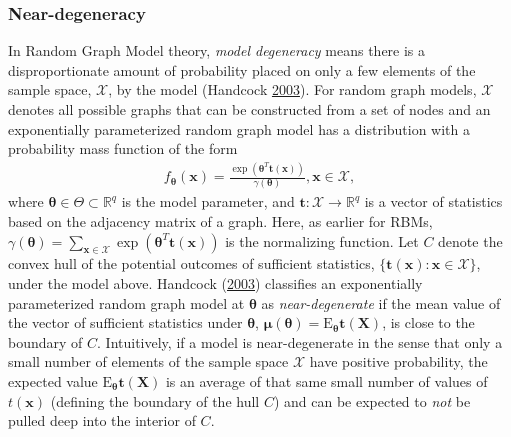 \documentclass[]{article}
\theoremstyle{definition}
\begin{document}
\hypertarget{near-degeneracy}{%
\subsubsection{Near-degeneracy}\label{near-degeneracy}}

In Random Graph Model theory, \emph{model degeneracy} means there is a
disproportionate amount of probability placed on only a few elements of
the sample space, \(\mathcal{X}\), by the model (Handcock
\protect\hyperlink{ref-handcock2003assessing}{2003}). For random graph
models, \(\mathcal{X}\) denotes all possible graphs that can be
constructed from a set of nodes and an exponentially parameterized
random graph model has a distribution with a probability mass function
of the form \begin{align*}
f_{\boldsymbol \theta} (\boldsymbol x) = \frac{\exp\left(\boldsymbol \theta^T \boldsymbol t(\boldsymbol x)\right)}{\gamma(\boldsymbol \theta)}, \boldsymbol x \in \mathcal{X},
\end{align*} where
\(\boldsymbol \theta \in \Theta \subset \mathbb{R}^q\) is the model
parameter, and \(\boldsymbol t: \mathcal{X} \rightarrow \mathbb{R}^q\)
is a vector of statistics based on the adjacency matrix of a graph.
Here, as earlier for RBMs,
\(\gamma(\boldsymbol \theta) = \sum_{\boldsymbol x \in \mathcal{X}} \exp\left(\boldsymbol \theta^T \boldsymbol t(\boldsymbol x)\right)\)
is the normalizing function. Let \(C\) denote the convex hull of the
potential outcomes of sufficient statistics,
\(\{\boldsymbol t(\boldsymbol x): \boldsymbol x \in \mathcal{X}\}\),
under the model above. Handcock
(\protect\hyperlink{ref-handcock2003assessing}{2003}) classifies an
exponentially parameterized random graph model at \(\boldsymbol \theta\)
as \emph{near-degenerate} if the mean value of the vector of sufficient
statistics under \(\boldsymbol \theta\),
\(\boldsymbol \mu(\boldsymbol \theta) = \text{E}_{\boldsymbol \theta}\boldsymbol t( \boldsymbol X)\),
is close to the boundary of \(C\). Intuitively, if a model is
near-degenerate in the sense that only a small number of elements of the
sample space \(\mathcal{X}\) have positive probability, the expected
value \(\text{E}_{\boldsymbol \theta}\boldsymbol t( \boldsymbol X)\) is
an average of that same small number of values of \(t( \boldsymbol x)\)
(defining the boundary of the hull \(C\)) and can be expected to
\emph{not} be pulled deep into the interior of \(C\).
\end{document}
